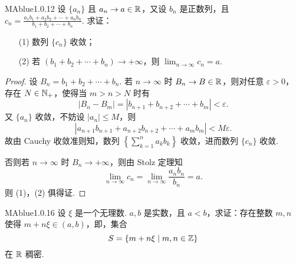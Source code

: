 \begin{problem}{MAblue}{1.0.12}
    设 $\{ a_n \}$ 且 $a_n \to a \in \mathbb R$，又设 $b_n$ 是正数列，且 $c_n = \frac{a_1b_1 + a_2b_2 + \cdots + a_nb_n}{b_1 + b_2 + \cdots + b_n}$. 求证：
    \begin{enumerate}
        \item[(1)]
        数列 $\{ c_n \}$ 收敛；
        \item[(2)]
        若 $(b_1 + b_2 + \cdots + b_n) \to +\infty$，则 $\lim_{n \to \infty} c_n = a$.
    \end{enumerate}
\end{problem}

\begin{proof}
    设 $B_n = b_1 + b_2 + \cdots + b_n$. 若 $n \to \infty$ 时 $B_n \to B \in \mathbb R$，则对任意 $\varepsilon > 0$，存在 $N \in \mathbb N_+$，使得当 $m > n > N$ 时有
    \[
        |B_n - B_m| = |b_{n+1} + b_{n+2} + \cdots + b_m| < \varepsilon.
    \]
    又 $\{ a_n \}$ 收敛，不妨设 $|a_n| \leqslant M$，则
    \[
        |a_{n+1}b_{n+1} + a_{n+2}b_{n+2} + \cdots + a_mb_m| < M\varepsilon.
    \]
    故由 Cauchy 收敛准则知，数列 $\left\{ \sum_{k=1}^n a_kb_k \right\}$ 收敛，进而数列 $\{ c_n \}$ 收敛.

    {\flushleft 否则若 $n \to \infty$ 时 $B_n \to +\infty$，则由 Stolz 定理知}
    \[
        \lim_{n \to \infty} c_n = \lim_{n \to \infty} \frac{a_nb_n}{b_n} = a.
    \]
    则 (1)，(2) 俱得证.
\end{proof}

\begin{problem}{MAblue}{1.0.16}
    设 $\xi$ 是一个无理数. $a, b$ 是实数，且 $a < b$，求证：存在整数 $m, n$ 使得 $m + n \xi \in (a, b)$，即，集合
    \[
        S = \{ m + n \xi \mid m, n \in \mathbb Z \}
    \]
    在 $\mathbb R$ 稠密.
\end{problem}

